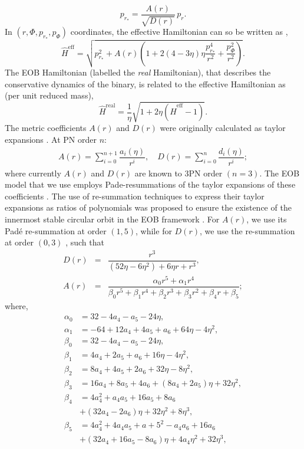 \documentclass[aps,
prd,
amsmath,
amssymb,
twocolumn,
floatfix,
groupedaddress]{revtex4-1}
\newcommand{\Sum}{\displaystyle\sum\limits}
\newcommand{\eff}{\mathrm{eff}}
\newcommand{\real}{\mathrm{real}}
\def\l({\left(}
\def\r){\right)}
\begin{document}
\begin{equation}
p_{r_*} = \dfrac{A(r)}{\sqrt{D(r)}}\,p_r.
\end{equation}
In $\l(r,\Phi,p_{r_*},p_{\Phi}\r)$ coordinates, the effective Hamiltonian can so be written as \citep{BuonannoEOBv2Main},
\begin{equation}
\hat{H}^{\eff} = \sqrt{p^2_{r_*} + A(r) \left( 1 + 2(4 - 3\eta)\eta \dfrac{p_{r_*}^4}{r^2} + \dfrac{p^2_{\Phi}}{r^2} \right)}.
\end{equation}
The EOB Hamiltonian (labelled the \textit{real} Hamiltonian), that describes the conservative dynamics of the binary,  is related to the effective Hamiltonian as (per unit reduced mass),
\begin{equation}
\hat{H}^{\real} = \dfrac{1}{\eta} \sqrt{1 + 2\eta (\hat{H}^{\eff} - 1)}.
\end{equation}
The metric coefficients $A(r)$ and $D(r)$ were originally calculated as taylor expansions \cite{EOBOriginalBuonannoDamour,PadeAD}. At PN order $n$:
\begin{eqnarray}
A(r) = \Sum^{n+1}_{i=0} \dfrac{a_i (\eta)}{r^i},\quad
D(r) = \Sum^{n}_{i=0} \dfrac{d_i (\eta)}{r^i};
\end{eqnarray}
where currently $A(r)$ and $D(r)$ are known to 3PN order $\l(n=3\r)$.  The EOB model that we use employs Pade-resummations of the taylor expansions of these coefficients \citep{BuonannoEOBv2Main}. The use of re-summation techniques to express their taylor expansions as ratios of polynomials was proposed to ensure the existence of the innermost stable circular orbit in the EOB framework \citep{PadeAD}. For $A(r)$, we use its Pad\'{e} re-summation at order $(1,5)$, while for $D(r)$, we use the re-summation  at order $(0,3)$ \citep{BuonannoEOBv2Main}, such that
\begin{eqnarray*}
D(r) &=& \dfrac{r^3}{(52\eta - 6\eta^2) + 6\eta r + r^3},\\
A(r) &=& \dfrac{\alpha_0 r^5 + \alpha_1 r^4}{\beta_0 r^5 + \beta_1 r^4 + \beta_2 r^3 + \beta_3 r^2 + \beta_4 r +\beta_5};
\end{eqnarray*}
where,
\begin{equation}
\begin{split}
\alpha_0 &= 32 - 4a_4 - a_5 - 24\eta ,\\
\alpha_1 &= -64 + 12a_4 + 4a_5 + a_6 + 64\eta - 4\eta^2 ,\\
\beta_0 &= 32 - 4a_4 - a_5 - 24\eta ,\\
\beta_1 &= 4a_4 + 2a_5 + a_6 + 16\eta - 4\eta^2 ,\\
\beta_2 &= 8a_4 + 4a_5 + 2a_6 + 32\eta - 8\eta^2 ,\\
\beta_3 &= 16a_4 + 8a_5 + 4a_6 + \left(8a_4 + 2a_5\right)\eta + 32\eta^2 ,\\
\beta_4 &= 4a_4^2 + a_4a_5 + 16a_5 + 8a_6\\ 
             &+ \left(32a_4 - 2a_6\right)\eta + 32\eta^2 + 8\eta^3 ,\\
\beta_5 &= 4a_4^2 + 4a_4a_5 + a+5^2 - a_4a_6 + 16a_6\\
             &+ \left(32a_4 + 16a_5 - 8a_6\right)\eta + 4a_4\eta^2 + 32\eta^3 ,\\
\end{split}
\end{equation}
\end{document}
